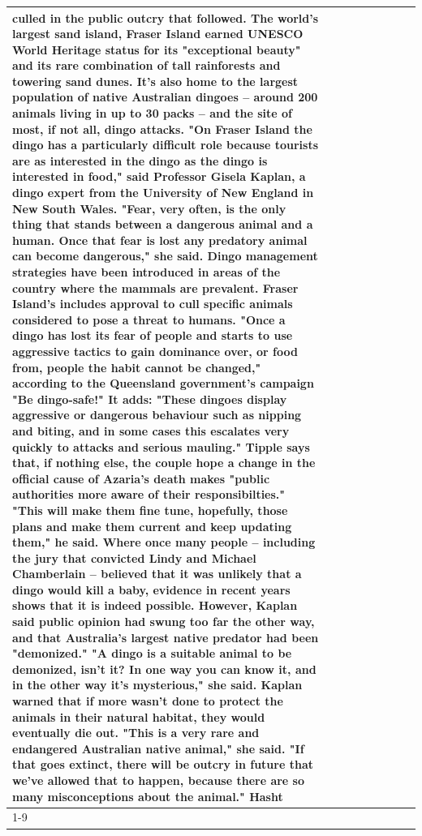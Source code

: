 \begin{table}[H]
\begin{tabular}{lllrlllll}
culled in the public outcry that followed. The world's largest sand island, Fraser Island earned UNESCO World Heritage status for its "exceptional beauty" and its rare combination of tall rainforests and towering sand dunes. It's also home to the largest population of native Australian dingoes -- around 200 animals living in up to 30 packs -- and the site of most, if not all, dingo attacks. "On Fraser Island the dingo has a particularly difficult role because tourists are as interested in the dingo as the dingo is interested in food," said Professor Gisela Kaplan, a dingo expert from the University of New England in New South Wales. "Fear, very often, is the only thing that stands between a dangerous animal and a human. Once that fear is lost any predatory animal can become dangerous," she said. Dingo management strategies have been introduced in areas of the country where the mammals are prevalent. Fraser Island's includes approval to cull specific animals considered to pose a threat to humans. "Once a dingo has lost its fear of people and starts to use aggressive tactics to gain dominance over, or food from, people the habit cannot be changed," according to the Queensland government's campaign "Be dingo-safe!" It adds: "These dingoes display aggressive or dangerous behaviour such as nipping and biting, and in some cases this escalates very quickly to attacks and serious mauling." Tipple says that, if nothing else, the couple hope a change in the official cause of Azaria's death makes "public authorities more aware of their responsibilties." "This will make them fine tune, hopefully, those plans and make them current and keep updating them," he said. Where once many people -- including the jury that convicted Lindy and Michael Chamberlain -- believed that it was unlikely that a dingo would kill a baby, evidence in recent years shows that it is indeed possible. However, Kaplan said public opinion had swung too far the other way, and that Australia's largest native predator had been "demonized." "A dingo is a suitable animal to be demonized, isn't it? In one way you can know it, and in the other way it's mysterious," she said. Kaplan warned that if more wasn't done to protect the animals in their natural habitat, they would eventually die out. "This is a very rare and endangered Australian native animal," she said. "If that goes extinct, there will be outcry in future that we've allowed that to happen, because there are so many misconceptions about the animal." Hasht \\
\cline{1-9}

\end{tabular}
\end{table}
